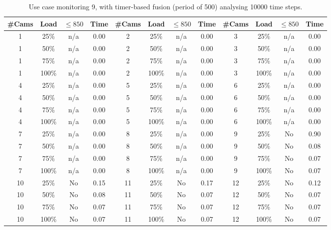 \documentclass{article}
\begin{document}
\begin{table}
\centering
\begin{tabular}{|c|c|c|c|c|c|c|c|c|c|c|c|}
\hline
\#Cams & Load & $\leq 850$ & Time & \#Cams & Load & $\leq 850$ & Time & \#Cams & Load & $\leq 850$ & Time\\
\hline
1 & 25\% & n/a & 0.00 & 2 & 25\% & n/a & 0.00 & 3 & 25\% & n/a & 0.00\\
1 & 50\% & n/a & 0.00 & 2 & 50\% & n/a & 0.00 & 3 & 50\% & n/a & 0.00\\
1 & 75\% & n/a & 0.00 & 2 & 75\% & n/a & 0.00 & 3 & 75\% & n/a & 0.00\\
1 & 100\% & n/a & 0.00 & 2 & 100\% & n/a & 0.00 & 3 & 100\% & n/a & 0.00\\
\hline
4 & 25\% & n/a & 0.00 & 5 & 25\% & n/a & 0.00 & 6 & 25\% & n/a & 0.00\\
4 & 50\% & n/a & 0.00 & 5 & 50\% & n/a & 0.00 & 6 & 50\% & n/a & 0.00\\
4 & 75\% & n/a & 0.00 & 5 & 75\% & n/a & 0.00 & 6 & 75\% & n/a & 0.00\\
4 & 100\% & n/a & 0.00 & 5 & 100\% & n/a & 0.00 & 6 & 100\% & n/a & 0.00\\
\hline
7 & 25\% & n/a & 0.00 & 8 & 25\% & n/a & 0.00 & 9 & 25\% & No & 0.90\\
7 & 50\% & n/a & 0.00 & 8 & 50\% & n/a & 0.00 & 9 & 50\% & No & 0.08\\
7 & 75\% & n/a & 0.00 & 8 & 75\% & n/a & 0.00 & 9 & 75\% & No & 0.07\\
7 & 100\% & n/a & 0.00 & 8 & 100\% & n/a & 0.00 & 9 & 100\% & No & 0.07\\
\hline
10 & 25\% & No & 0.15 & 11 & 25\% & No & 0.17 & 12 & 25\% & No & 0.12\\
10 & 50\% & No & 0.08 & 11 & 50\% & No & 0.07 & 12 & 50\% & No & 0.07\\
10 & 75\% & No & 0.07 & 11 & 75\% & No & 0.07 & 12 & 75\% & No & 0.07\\
10 & 100\% & No & 0.07 & 11 & 100\% & No & 0.07 & 12 & 100\% & No & 0.07\\
\hline
\end{tabular}
\caption{Use case monitoring 9, with timer-based fusion (period of 500) analysing 10000 time steps.}
\end{table}
\end{document}
